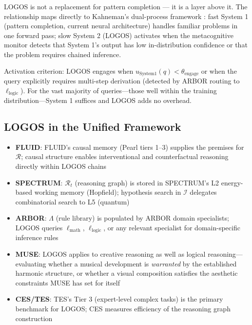 \documentclass[12pt]{article}
\begin{document}
LOGOS is not a replacement for pattern completion --- it is a layer above it. The relationship maps directly to Kahneman's dual-process framework \cite{kahneman2011}: fast System 1 (pattern completion, current neural architecture) handles familiar problems in one forward pass; slow System 2 (LOGOS) activates when the metacognitive monitor detects that System 1's output has low in-distribution confidence or that the problem requires chained inference.

Activation criterion: LOGOS engages when $u_{\text{System1}}(q) < \theta_{\text{engage}}$ or when the query explicitly requires multi-step derivation (detected by ARBOR routing to $\ell_{\text{logic}}$). For the vast majority of queries---those well within the training distribution---System 1 suffices and LOGOS adds no overhead.

\subsection{LOGOS in the Unified Framework}

\begin{itemize}
    \item \textbf{FLUID}: FLUID's causal memory (Pearl tiers 1--3) supplies the premises for $\mathcal{R}$; causal structure enables interventional and counterfactual reasoning directly within LOGOS chains
    \item \textbf{SPECTRUM}: $\mathcal{R}_t$ (reasoning graph) is stored in SPECTRUM's L2 energy-based working memory (Hopfield); hypothesis search in $\mathcal{I}$ delegates combinatorial search to L5 (quantum)
    \item \textbf{ARBOR}: $\Lambda$ (rule library) is populated by ARBOR domain specialists; LOGOS queries $\ell_{\text{math}}$, $\ell_{\text{logic}}$, or any relevant specialist for domain-specific inference rules
    \item \textbf{MUSE}: LOGOS applies to creative reasoning as well as logical reasoning---evaluating whether a musical development is \textit{warranted} by the established harmonic structure, or whether a visual composition satisfies the aesthetic constraints MUSE has set for itself
    \item \textbf{CES/TES}: TES's Tier 3 (expert-level complex tasks) is the primary benchmark for LOGOS; CES measures efficiency of the reasoning graph construction
\end{itemize}

\end{document}
